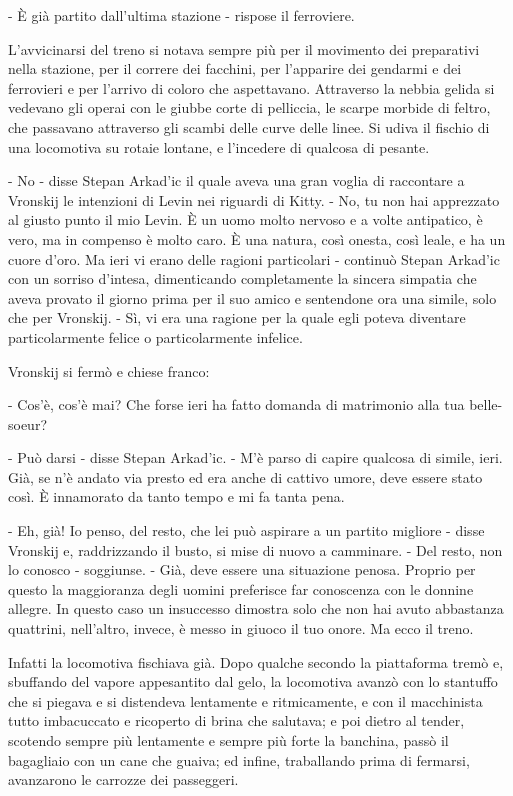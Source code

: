 - È già partito dall'ultima stazione - rispose il ferroviere. 

L'avvicinarsi del treno si notava sempre più per il movimento dei preparativi nella stazione, per il correre dei facchini, per l'apparire dei gendarmi e dei ferrovieri e per l'arrivo di coloro che aspettavano. Attraverso la nebbia gelida si vedevano gli operai con le giubbe corte di pelliccia, le scarpe morbide di feltro, che passavano attraverso gli scambi delle curve delle linee. Si udiva il fischio di una locomotiva su rotaie lontane, e l'incedere di qualcosa di pesante. 

- No - disse Stepan Arkad'ic il quale aveva una gran voglia di raccontare a Vronskij le intenzioni di Levin nei riguardi di Kitty. - No, tu non hai apprezzato al giusto punto il mio Levin. È un uomo molto nervoso e a volte antipatico, è vero, ma in compenso è molto caro. È una natura, così onesta, così leale, e ha un cuore d'oro. Ma ieri vi erano delle ragioni particolari - continuò Stepan Arkad'ic con un sorriso d'intesa, dimenticando completamente la sincera simpatia che aveva provato il giorno prima per il suo amico e sentendone ora una simile, solo che per Vronskij. - Sì, vi era una ragione per la quale egli poteva diventare particolarmente felice o particolarmente infelice. 

Vronskij si fermò e chiese franco: 

- Cos'è, cos'è mai? Che forse ieri ha fatto domanda di matrimonio alla tua belle-soeur? 

- Può darsi - disse Stepan Arkad'ic. - M'è parso di capire qualcosa di simile, ieri. Già, se n'è andato via presto ed era anche di cattivo umore, deve essere stato così. È innamorato da tanto tempo e mi fa tanta pena. 

- Eh, già! Io penso, del resto, che lei può aspirare a un partito migliore - disse Vronskij e, raddrizzando il busto, si mise di nuovo a camminare. - Del resto, non lo conosco - soggiunse. - Già, deve essere una situazione penosa. Proprio per questo la maggioranza degli uomini preferisce far conoscenza con le donnine allegre. In questo caso un insuccesso dimostra solo che non hai avuto abbastanza quattrini, nell'altro, invece, è messo in giuoco il tuo onore. Ma ecco il treno. 

Infatti la locomotiva fischiava già. Dopo qualche secondo la piattaforma tremò e, sbuffando del vapore appesantito dal gelo, la locomotiva avanzò con lo stantuffo che si piegava e si distendeva lentamente e ritmicamente, e con il macchinista tutto imbacuccato e ricoperto di brina che salutava; e poi dietro al tender, scotendo sempre più lentamente e sempre più forte la banchina, passò il bagagliaio con un cane che guaiva; ed infine, traballando prima di fermarsi, avanzarono le carrozze dei passeggeri. 

